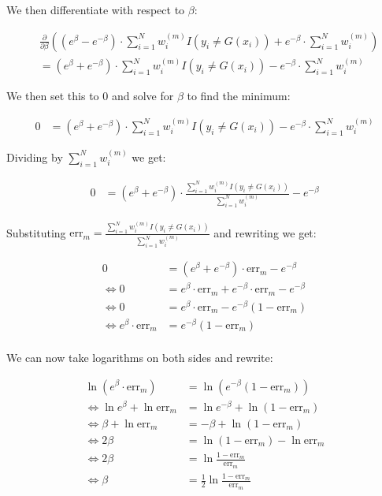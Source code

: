 \documentclass[a4paper, 12pt]{article}
\begin{document}
We then differentiate with respect to $\beta$:

\begin{align}
	&\frac{\partial}{\partial \beta} \left( \left(e^{\beta}-e^{-\beta}\right) \cdot \sum_{i=1}^{N} w_{i}^{(m)} I\left(y_{i} \neq G\left(x_{i}\right)\right)+e^{-\beta} \cdot \sum_{i=1}^{N} w_{i}^{(m)} \right)\\
	&= \left(e^{\beta} + e^{-\beta}\right) \cdot \sum_{i=1}^{N} w_{i}^{(m)} I\left(y_{i} \neq G\left(x_{i}\right)\right) - e^{-\beta} \cdot \sum_{i=1}^{N} w_{i}^{(m)}
\end{align}

We then set this to $0$ and solve for $\beta$ to find the minimum:

\begin{align}
	0 &= \left(e^{\beta} + e^{-\beta}\right) \cdot \sum_{i=1}^{N} w_{i}^{(m)} I\left(y_{i} \neq G\left(x_{i}\right)\right) - e^{-\beta} \cdot \sum_{i=1}^{N} w_{i}^{(m)}
\end{align}

Dividing by $\sum_{i=1}^{N} w_{i}^{(m)}$ we get:

\begin{align}
	0 &= \left(e^{\beta} + e^{-\beta}\right) \cdot \frac{\sum_{i=1}^{N} w_{i}^{(m)} I\left(y_{i} \neq G\left(x_{i}\right)\right)}{\sum_{i=1}^{N} w_{i}^{(m)}} - e^{-\beta}
\end{align}

Substituting $\text{err}_m = \frac{\sum_{i=1}^{N} w_{i}^{(m)} I\left(y_{i} \neq G\left(x_{i}\right)\right)}{\sum_{i=1}^{N} w_{i}^{(m)}}$ and rewriting we get:

\begin{align}
	0 &= \left(e^{\beta} + e^{-\beta}\right) \cdot\text{err}_m - e^{-\beta}\\
	\iff 0 &= e^{\beta} \cdot \text{err}_m + e^{-\beta} \cdot \text{err}_m - e^{-\beta}\\
	\iff 0 &= e^{\beta} \cdot \text{err}_m - e^{-\beta} (1 - \text{err}_m)\\
	\iff e^{\beta} \cdot \text{err}_m &= e^{-\beta} (1 - \text{err}_m)\\
\end{align}

We can now take logarithms on both sides and rewrite:


\begin{align}
	\ln (e^{\beta} \cdot \text{err}_m) &= \ln (e^{-\beta} (1 - \text{err}_m))\\
	\iff \ln e^{\beta} + \ln \text{err}_m &= \ln e^{-\beta} + \ln (1 - \text{err}_m)\\
	\iff \beta + \ln \text{err}_m &= -\beta + \ln (1 - \text{err}_m)\\
	\iff 2\beta &= \ln (1 - \text{err}_m) - \ln \text{err}_m\\
	\iff 2\beta &= \ln \frac{1 - \text{err}_m}{\text{err}_m}\\
	\iff \beta &= \frac{1}{2} \ln \frac{1 - \text{err}_m}{\text{err}_m}\\
\end{align}
\end{document}
